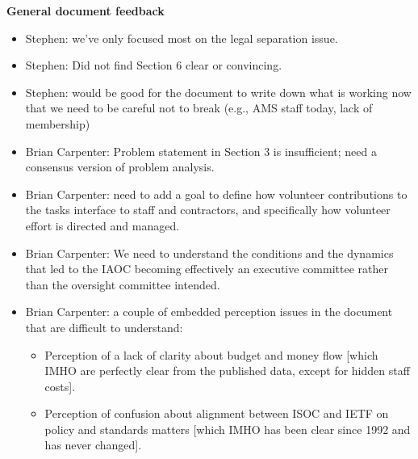 \documentclass[helvetica]{seminar}
\newcommand{\heading}[1]{%
  \begin{center} 
    \large\bf 
    #1 
  \end{center} 
  \vspace{.4 in}}
\begin{document}
\begin{slide}

\heading{General document feedback}

\vspace{-8ex}         %

\begin{itemize}
\item Stephen: we've only focused most on the legal separation issue.
\item Stephen: Did not find Section 6 clear or convincing.
\item Stephen: would be good for the document to write down what is
  working now that we need to be careful not to break (e.g., AMS staff
  today, lack of membership)
\item Brian Carpenter: Problem statement in Section 3 is insufficient;
  need a consensus version of problem analysis.
\item Brian Carpenter: need to add a goal to define how volunteer
  contributions to the tasks interface to staff and contractors, and
  specifically how volunteer effort is directed and managed.
\item Brian Carpenter: We need to understand the conditions and the
  dynamics that led to the IAOC becoming effectively an executive
  committee rather than the oversight committee intended.
\item Brian Carpenter: a couple of embedded perception issues in the
  document that are difficult to understand:
  \begin{itemize}
  \item Perception of a lack of clarity about budget and money flow
    [which IMHO are perfectly clear from the published data, except
      for hidden staff costs].
  \item Perception of confusion about alignment between ISOC and IETF
    on policy and standards matters [which IMHO has been clear since
      1992 and has never changed].
  \end{itemize}
\end{itemize}

\end{slide}
\end{document}
